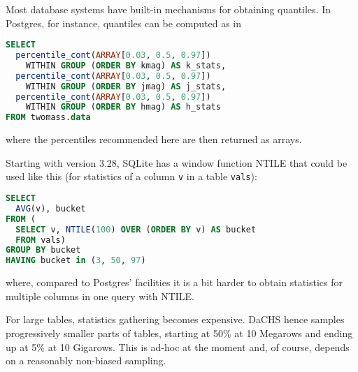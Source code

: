 \documentclass[11pt,a4paper]{ivoa}
\begin{document}
Most database systems have built-in mechanisms for obtaining
quantiles.  In Postgres, for instance, quantiles can be computed as in

\begin{lstlisting}[language=SQL]
SELECT 
  percentile_cont(ARRAY[0.03, 0.5, 0.97]) 
    WITHIN GROUP (ORDER BY kmag) AS k_stats,
  percentile_cont(ARRAY[0.03, 0.5, 0.97]) 
    WITHIN GROUP (ORDER BY jmag) AS j_stats,
  percentile_cont(ARRAY[0.03, 0.5, 0.97]) 
    WITHIN GROUP (ORDER BY hmag) AS h_stats
FROM twomass.data
\end{lstlisting}

where the percentiles recommended here are then returned as arrays.

Starting with version 3.28, SQLite has a window function NTILE that could be
used like this (for statistics of a column \verb|v| in a table
\verb|vals|):

\begin{lstlisting}[language=SQL]
SELECT 
  AVG(v), bucket 
FROM (
  SELECT v, NTILE(100) OVER (ORDER BY v) AS bucket 
  FROM vals) 
GROUP BY bucket 
HAVING bucket in (3, 50, 97)
\end{lstlisting}

where, compared to Postgres' facilities it is a bit harder to obtain
statistics for multiple columns in one query with NTILE.

For large tables, statistics gathering becomes expensive.  DaCHS hence
samples progressively smaller parts of tables, starting at 50\% at 10
Megarows and ending up at 5\% at 10 Gigarows.  This is ad-hoc at the
moment and, of course, depends on a reasonably non-biased sampling.


\end{document}
